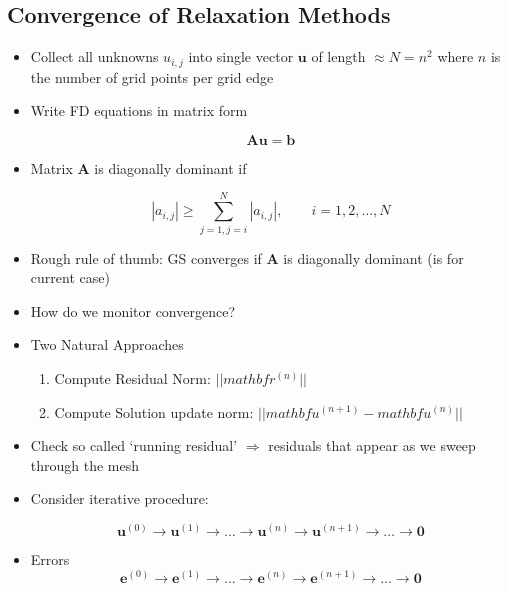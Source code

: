 \subsection{Convergence of Relaxation Methods}
\begin{itemize}
    \item Collect all unknowns $u_{i,j}$ into single vector $\mathbf{u}$ of length $\approx N = n^2$ where $n$ is the number of grid points per grid edge

    \item Write FD equations in matrix form

    \[ \mathbf{A} \mathbf{u} = \mathbf{b}\]

    \item Matrix $\mathbf{A}$ is diagonally dominant if 

    \[|a_{i,j}| \ge \sum_{j=1,j=i}^{N} |a_{i,j}|, \qquad i = 1,2,\ldots , N\]

    \item Rough rule of thumb: GS converges if $\mathbf{A}$ is diagonally dominant (is for current case)

    \item How do we monitor convergence?

    \item Two Natural Approaches

    \begin{enumerate}
        \item Compute Residual Norm: $||mathbf{r}^{(n)}||$

        \item Compute Solution update norm: $||mathbf{u}^{(n+1)}-mathbf{u}^{(n)}||$
    \end{enumerate}

    \item Check so called `running residual' $\Rightarrow$ residuals that appear as we sweep through the mesh

    \item Consider iterative procedure:

    \[ \mathbf{u}^{(0)} \rightarrow \mathbf{u}^{(1)} 
    \rightarrow \ldots
    \rightarrow \mathbf{u}^{(n)} \rightarrow \mathbf{u}^{(n+1)} \rightarrow \ldots \rightarrow \mathbf{0}\]

    \item Errors 
    \[ \mathbf{e}^{(0)} \rightarrow \mathbf{e}^{(1)} 
    \rightarrow \ldots
    \rightarrow \mathbf{e}^{(n)} \rightarrow \mathbf{e}^{(n+1)} \rightarrow \ldots \rightarrow \mathbf{0}\]


\end{itemize}
